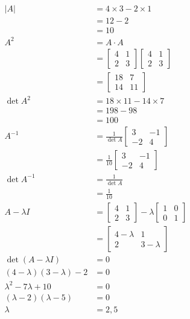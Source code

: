 \documentclass[main.tex]{subfiles}
\begin{document}
\begin{enumerate}
    $$
    \begin{aligned}
    |A| &=4 \times 3-2 \times 1 \\
    &=12-2 \\
    &=10 \\
    A^{2} &=A \cdot A \\
    &=\left[\begin{array}{ll}
    4 & 1 \\
    2 & 3
    \end{array}\right]\left[\begin{array}{ll}
    4 & 1 \\
    2 & 3
    \end{array}\right] \\
    &=\left[\begin{array}{cc}
    18 & 7 \\
    14 & 11
    \end{array}\right]\\
    \operatorname{det} A^{2} &=18 \times 11-14 \times 7 \\
    &=198-98 \\
    &=100 \\
    A^{-1} &= \frac{1}{\operatorname{det} A}\left[\begin{array}{cc}
    3 & -1 \\
    -2 & 4
    \end{array}\right] \\
    & = \frac{1}{10}\left[\begin{array}{cc}
    3 & -1 \\
    -2 & 4
    \end{array}\right]\\
    \operatorname{det} A^{-1} &=\frac{1}{\operatorname{det} A} \\
    &=\frac{1}{10} \\
    A-\lambda I &=\left[\begin{array}{ll}
    4 & 1 \\
    2 & 3
    \end{array}\right]-\lambda\left[\begin{array}{ll}
    1 & 0 \\
    0 & 1
    \end{array}\right] \\
    &=\left[\begin{array}{cc}
    4-\lambda & 1 \\
    2 & 3-\lambda
    \end{array}\right] \\
    \operatorname{det}(A-\lambda I) &=0 \\
    (4-\lambda)(3-\lambda)-2 &=0 \\
    \lambda^{2}-7 \lambda+10 &=0 \\
    (\lambda-2)(\lambda-5) &=0 \\
    \lambda&=2,5
    \end{aligned}
    $$
    

\end{enumerate}
\end{document}
